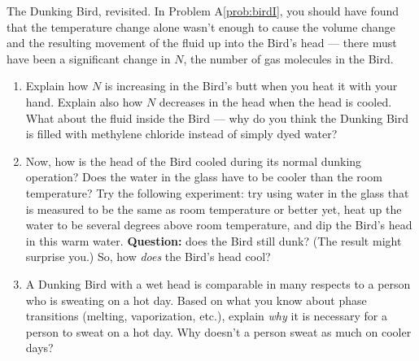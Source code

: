 \begin{aproblem}{The Dunking Bird, revisited.} 
  In Problem A\ref{prob:birdI}, you should have found that the
  temperature change alone wasn't enough to cause the volume change
  and the resulting movement of the fluid up into the Bird's head ---
  there must have been a significant change in $N$, the number of gas
  molecules in the Bird.

  \begin{enumerate}
  \item Explain how $N$ is increasing in the Bird's butt when you heat
    it with your hand.  Explain also how $N$ decreases in the head
    when the head is cooled.  What about the fluid inside the Bird ---
    why do you think the Dunking Bird is filled with methylene
    chloride instead of simply dyed water?

  \item Now, how is the head of the Bird cooled during its normal
    dunking operation?  Does the water in the glass have to be cooler
    than the room temperature?  Try the following experiment: try
    using water in the glass that is measured to be the same as room
    temperature or better yet, heat up the water to be several degrees
    above room temperature, and dip the Bird's head in this warm
    water.  {\bf Question:} does the Bird still dunk?  (The result
    might surprise you.)  So, how {\em does} the Bird's head cool?

  \item A Dunking Bird with a wet head is comparable in many respects
    to a person who is sweating on a hot day.  Based on what you know
    about phase transitions (melting, vaporization, etc.), explain
    {\em why} it is necessary for a person to sweat on a hot day.  Why
    doesn't a person sweat as much on cooler days?
  \end{enumerate}
\end{aproblem}


